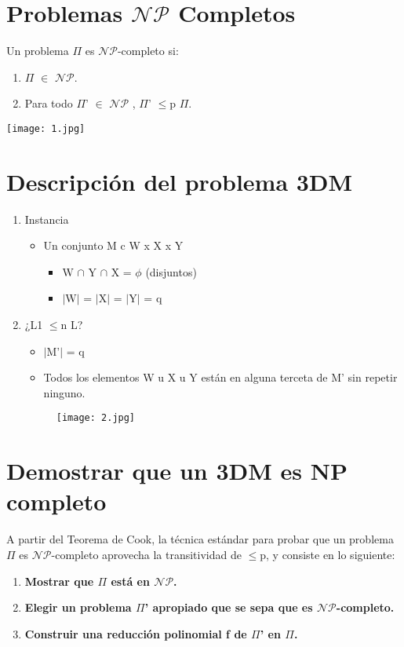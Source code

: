 \documentclass[a4paper,10pt]{article}
\begin{document}
\section{Problemas $\mathcal{NP}$ Completos}
	Un problema $\Pi$ es $\mathcal{NP}$-completo si:
	\begin{enumerate}

	\item $\Pi$ $\in$ $\mathcal{NP}$.
	\item Para todo $\Pi$' $\in$ $\mathcal{NP}$ , $\Pi$' $\leq$p $\Pi$.
	\end{enumerate}
		\texttt{[image: 1.jpg]}

\section{Descripción del problema 3DM}

\begin{enumerate}

	\item Instancia
		\begin{itemize}
			\item Un conjunto M c W x X x Y	
			\begin{itemize}
				\item W $\cap$ Y $\cap$ X = $\phi$ (disjuntos)
				\item $\mid$W$\mid$ = $\mid$X$\mid$ = $\mid$Y$\mid$ = q
			\end{itemize}
		\end{itemize}
			
	\item ¿L1 $\leq$n L?
		\begin{itemize}
			\item $\mid$M'$\mid$ = q
			\item Todos los elementos W u X u Y están en alguna terceta de M' sin repetir ninguno.
		\end{itemize}
		\begin{figure}[h!]
			\texttt{[image: 2.jpg]}
		\end{figure}
	
\end{enumerate}

\section{Demostrar que un 3DM es NP completo}
	A partir del Teorema de Cook, la técnica estándar para probar que un problema $\Pi$ es $\mathcal{NP}$-completo aprovecha la transitividad de $\leq$p, y consiste en lo siguiente: 
	\begin{enumerate}
		\item \textbf{Mostrar que $\Pi$ está en $\mathcal{NP}$.}
		\item \textbf{Elegir un problema $\Pi$' apropiado que se sepa que es $\mathcal{NP}$-completo.}
		\item \textbf{Construir una reducción polinomial f de $\Pi$' en $\Pi$.}
	\end{enumerate}
\end{document}
